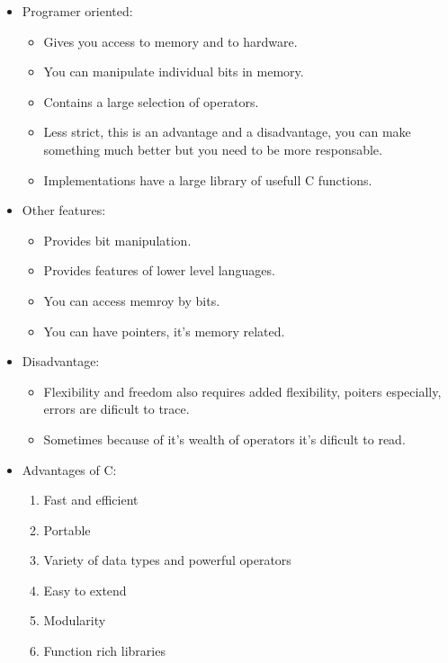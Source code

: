 \begin{itemize}
    \item Programer oriented:
        \begin{itemize}
            \item Gives you access to memory and to hardware.
            \item You can manipulate individual bits in memory.
            \item Contains a large selection of operators.
            \item Less strict, this is an advantage and a disadvantage, you can make something much better but you need to be more responsable.
            \item Implementations have a large library of usefull C functions.
        \end{itemize}
    
    \item Other features:
        \begin{itemize}
            \item Provides bit manipulation.
            \item Provides features of lower level languages.
            \item You can access memroy by bits.
            \item You can have pointers, it's memory related.
        \end{itemize}
    
    \item Disadvantage:
        \begin{itemize}
            \item Flexibility and freedom also requires added flexibility, poiters especially, errors are dificult to trace.
            \item Sometimes because of it's wealth of operators it's dificult to read.
        \end{itemize}
    
    \item Advantages of C:
        \begin{enumerate}
            \item Fast and efficient
            \item Portable 
            \item Variety of data types and powerful operators
            \item Easy to extend
            \item Modularity 
            \item Function rich libraries
        \end{enumerate}
\end{itemize}
